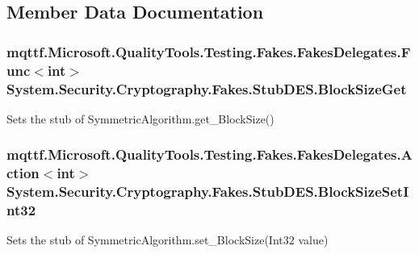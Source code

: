 \subsection{Member Data Documentation}
\hypertarget{class_system_1_1_security_1_1_cryptography_1_1_fakes_1_1_stub_d_e_s_aedf3d17d1e48c511523f0edd0079c9cd}{
\subsubsection[{Block\-Size\-Get}]{\setlength{\rightskip}{0pt plus 5cm}mqttf.\-Microsoft.\-Quality\-Tools.\-Testing.\-Fakes.\-Fakes\-Delegates.\-Func$<$int$>$ System.\-Security.\-Cryptography.\-Fakes.\-Stub\-D\-E\-S.\-Block\-Size\-Get}}\label{class_system_1_1_security_1_1_cryptography_1_1_fakes_1_1_stub_d_e_s_aedf3d17d1e48c511523f0edd0079c9cd}


Sets the stub of Symmetric\-Algorithm.\-get\-\_\-\-Block\-Size()

\hypertarget{class_system_1_1_security_1_1_cryptography_1_1_fakes_1_1_stub_d_e_s_a64668ce59f457990ce0660fcdb81109f}{
\subsubsection[{Block\-Size\-Set\-Int32}]{\setlength{\rightskip}{0pt plus 5cm}mqttf.\-Microsoft.\-Quality\-Tools.\-Testing.\-Fakes.\-Fakes\-Delegates.\-Action$<$int$>$ System.\-Security.\-Cryptography.\-Fakes.\-Stub\-D\-E\-S.\-Block\-Size\-Set\-Int32}}\label{class_system_1_1_security_1_1_cryptography_1_1_fakes_1_1_stub_d_e_s_a64668ce59f457990ce0660fcdb81109f}


Sets the stub of Symmetric\-Algorithm.\-set\-\_\-\-Block\-Size(\-Int32 value)

